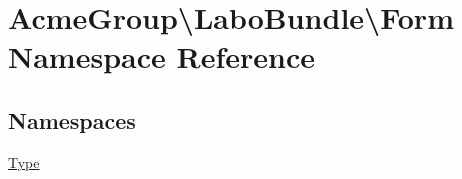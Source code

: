 \hypertarget{namespace_acme_group_1_1_labo_bundle_1_1_form}{\section{Acme\+Group\textbackslash{}Labo\+Bundle\textbackslash{}Form Namespace Reference}
\label{namespace_acme_group_1_1_labo_bundle_1_1_form}
}
\subsection*{Namespaces}
\begin{DoxyCompactItemize}
\item 
 \hyperlink{namespace_acme_group_1_1_labo_bundle_1_1_form_1_1_type}{Type}
\end{DoxyCompactItemize}
